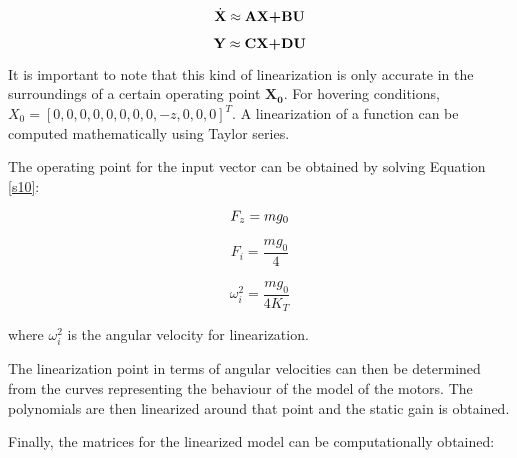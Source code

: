 \begin{equation}
\label{s1} 
 	\dot{\textbf{X}}\approx\textbf{AX+BU} \\
 \end{equation}

\begin{equation}
\label{s2} 
 	\textbf{Y}\approx\textbf{CX+DU} \\
 \end{equation}

It is important to note that this kind of linearization is only accurate in the surroundings of a certain operating point $\mathbf{X_{0}}$. For hovering conditions, $X_{0}=[0, 0, 0, 0, 0, 0, 0, 0, -z, 0, 0, 0]^{T}$. A linearization of a function can be computed mathematically using Taylor series.

The operating point for the input vector can be obtained by solving Equation \ref{s10}:

\begin{equation}
\label{s10} 
 	F_{z}=mg_{0} \\
 \end{equation}
 
 \begin{equation}
\label{s11} 
 	F_{i}=\frac{mg_{0}}{4}
 \end{equation}
 
 \begin{equation}
\label{s12} 
 	\omega_{i}^{2}=\frac{mg_{0}}{4K_{T}}
 \end{equation}
 
where $\omega_{i}^{2}$ is the angular velocity for linearization.

The linearization point in terms of angular velocities can then be determined from the curves representing the behaviour of the model of the motors. The polynomials are then linearized around that point and the static gain is obtained.

Finally, the matrices for the linearized model can be computationally obtained:

\setcounter{MaxMatrixCols}{20}

